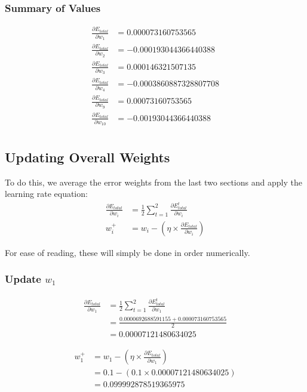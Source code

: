 \documentclass{article}
\begin{document}
\subsubsection{Summary of Values}
\begin{align*}
\frac{\partial E_{total}}{\partial w_1} & = 0.000073160753565 \\
\frac{\partial E_{total}}{\partial w_2} & = -0.000193044366440388 \\
\frac{\partial E_{total}}{\partial w_3} & = 0.000146321507135 \\
\frac{\partial E_{total}}{\partial w_4} & = -0.0003860887328807708 \\
\frac{\partial E_{total}}{\partial w_9} & = 0.00073160753565 \\
\frac{\partial E_{total}}{\partial w_{10}} & = -0.00193044366440388 \\
\end{align*}

\subsection{Updating Overall Weights}
To do this, we average the error weights from the last two sections and apply
the learning rate equation:
\begin{align*}
    \frac{\partial E_{total}}{\partial w_i} & =
        \frac{1}{2}
            \sum_{t=1}^{2}{
                \frac{\partial E_{total}^{t}}{\partial w_i}}
    \\
    w_{i}^{+} &= w_i - (\eta \times \frac{\partial E_{total}}{\partial w_i})
\end{align*}

For ease of reading, these will simply be done in order numerically.

\subsubsection{Update $w_1$}
\begin{align*}
    \frac{\partial E_{total}}{\partial w_1} & =
        \frac{1}{2}
            \sum_{t=1}^{2}{
                \frac{\partial E_{total}^{t}}{\partial w_1}}\\
    & = \frac{0.0000692688591155 + 0.000073160753565}{2} \\
    & = 0.00007121480634025
\end{align*}

\begin{align*}
    w_{1}^{+} &= w_1 - (\eta \times \frac{\partial E_{total}}{\partial w_1}) \\
    & = 0.1 - (0.1 \times 0.00007121480634025) \\
    & = 0.099992878519365975
\end{align*}
\end{document}
